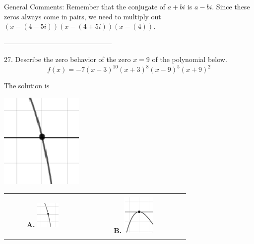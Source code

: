 \documentclass{article}[14pt]
\begin{document}
General Comments: Remember that the conjugate of $a+bi$ is $a-bi$. Since these zeros always come in pairs, we need to multiply out $(x-(4 - 5i))(x-(4 + 5i))(x-(4))$.

-----------------------------------------------

27. Describe the zero behavior of the zero $x = 9$ of the polynomial below.
$$ f(x) = -7(x - 3)^{10}(x + 3)^{8}(x - 9)^{5}(x + 9)^{2} $$ 

 
 The solution is  
 \begin{center} \includegraphics[width=0.3\textwidth]{../Figures/zeroBehaviorNegativeOddB.png} \end{center}\begin{tabular}{|c|c|} 
\hline 
 & \tabularnewline 
 \textbf{A.} \includegraphics[width=0.3\textwidth]{../Figures/zeroBehaviorNegativeOddB.png} & \textbf{B.} \includegraphics[width=0.3\textwidth]{../Figures/zeroBehaviorNegativeEvenB.png} \tabularnewline 
\hline 
 & \tabularnewline 

\end{tabular}
\end{document}
